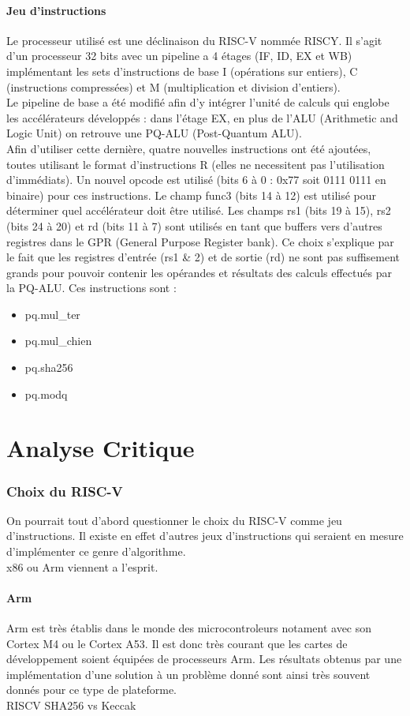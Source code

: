 \documentclass[10pt,a4paper]{article}
\begin{document}
\subsection{Jeu d'instructions}
Le processeur utilisé est une déclinaison du RISC-V nommée RISCY. Il s'agit d'un processeur 32 bits avec un pipeline a 4 étages (IF, ID, EX et WB) implémentant les sets d'instructions de base
I (opérations sur entiers), C (instructions compressées) et M (multiplication et division d'entiers).\\
Le pipeline de base a été modifié afin d'y intégrer l'unité de calculs qui englobe les accélérateurs développés : dans l'étage EX, en plus de l'ALU (Arithmetic and Logic Unit) on retrouve une 
PQ-ALU (Post-Quantum ALU). \\ 
Afin d'utiliser cette dernière, quatre nouvelles instructions ont été ajoutées, toutes utilisant le format d'instructions R (elles ne necessitent pas l'utilisation d'immédiats). Un nouvel opcode 
est utilisé (bits 6 à 0 : 0x77 soit 0111 0111 en binaire) pour ces instructions. Le champ func3 (bits 14 à 12) est utilisé pour déterminer quel accélérateur doit être utilisé. Les champs rs1 (bits 
19 à 15), rs2 (bits 24 à 20) et rd (bits 11 à 7) sont utilisés en tant que buffers vers d'autres registres dans le GPR (General Purpose Register bank). Ce choix s'explique par le fait que les registres 
d'entrée (rs1 \& 2) et de sortie (rd) ne sont pas suffisement grands pour pouvoir contenir les opérandes et résultats des calculs effectués par la PQ-ALU. Ces instructions sont :\\
\begin{itemize}
    \item pq.mul\_ter
    \item pq.mul\_chien 
    \item pq.sha256 
    \item pq.modq
\end{itemize}
\newpage
\part{Analyse Critique}

\section{Choix du RISC-V}

On pourrait tout d'abord questionner le choix du RISC-V comme jeu d'instructions. Il existe en effet d'autres jeux d'instructions qui seraient en mesure d'implémenter ce genre d'algorithme.\\
x86 ou Arm viennent a l'esprit. 
\subsection{Arm}
Arm est très établis dans le monde des microcontroleurs notament avec son Cortex M4 ou le Cortex A53. Il est donc très courant que les cartes de développement soient équipées 
de processeurs Arm. Les résultats obtenus par une implémentation d'une solution à un problème donné sont ainsi très souvent donnés pour ce type de plateforme.\\






RISCV
SHA256 vs Keccak
\end{document}
